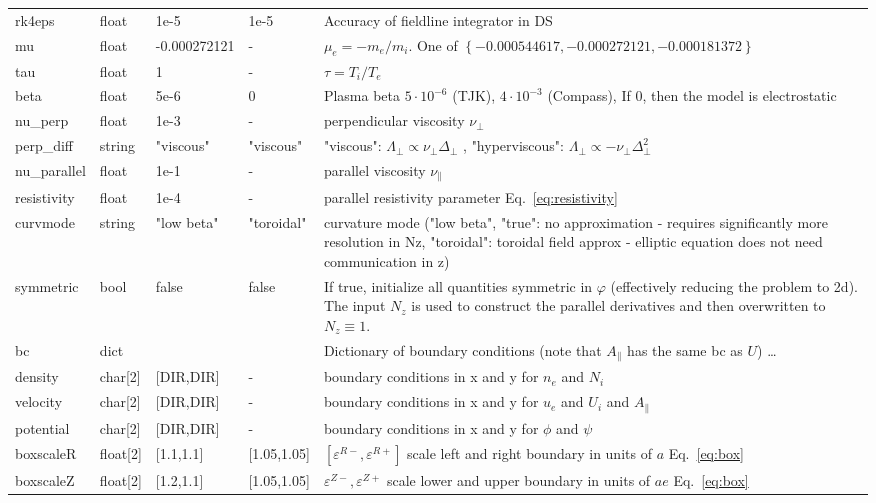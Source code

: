 \begin{longtable}{llll>{\RaggedRight}p{6cm}}
rk4eps     & float & 1e-5 & 1e-5 & Accuracy of fieldline integrator in DS\\
mu         & float & -0.000272121& - & $\mu_e =-m_e/m_i$.
    One of $\left\{ -0.000544617, -0.000272121, -0.000181372 \right\}$\\
tau        & float &1      & - & $\tau = T_i/T_e$  \\
beta       & float & 5e-6  & 0 & Plasma beta $5\cdot 10^{-6}$ (TJK), $4\cdot 10^{-3}$ (Compass), If $0$, then the model is electrostatic \\
nu\_perp   & float &1e-3   & - & perpendicular viscosity $\nu_\perp$ \\
perp\_diff & string & "viscous" & "viscous" & "viscous": $\Lambda_\perp\propto \nu_\perp\Delta_\perp$ , "hyperviscous": $\Lambda_\perp \propto -\nu_\perp\Delta_\perp^2$\\
nu\_parallel & float &1e-1 & - & parallel viscosity $\nu_\parallel$ \\
resistivity & float &1e-4  & - & parallel resistivity parameter Eq.~\eqref{eq:resistivity}\\
curvmode  & string & "low beta"  & "toroidal"& curvature mode ("low beta", "true": no approximation - requires significantly more resolution in Nz, "toroidal": toroidal field approx - elliptic equation does not need communication in z)  \\
symmetric & bool & false & false & If true, initialize all quantities symmetric in $\varphi$ (effectively reducing the problem to 2d). The input $N_z$ is used to construct the parallel derivatives and then overwritten to $N_z\equiv 1$. \\
bc & dict & & & Dictionary of boundary conditions (note that $A_\parallel$ has the same bc as $U$) \ldots\\
\qquad density   & char[2] & [DIR,DIR] & -  & boundary conditions in x and y for $n_e$ and $N_i$\\
\qquad velocity  & char[2] & [DIR,DIR] & - & boundary conditions in x and y for $u_e$ and $U_i$ and $A_\parallel$\\
\qquad potential & char[2] & [DIR,DIR] & - & boundary conditions in x and y for $\phi$ and $\psi$\\
    boxscaleR  & float[2] & [1.1,1.1]     & [1.05,1.05] & $[\varepsilon^{R-}, \varepsilon^{R+}]$ scale left and right boundary in units of $a$ Eq.~\eqref{eq:box}\\
    boxscaleZ  & float[2] & [1.2,1.1]     & [1.05,1.05] & $\varepsilon^{Z-}, \varepsilon^{Z+}$ scale lower and upper boundary in units of $ae$ Eq.~\eqref{eq:box} \\

\end{longtable}
